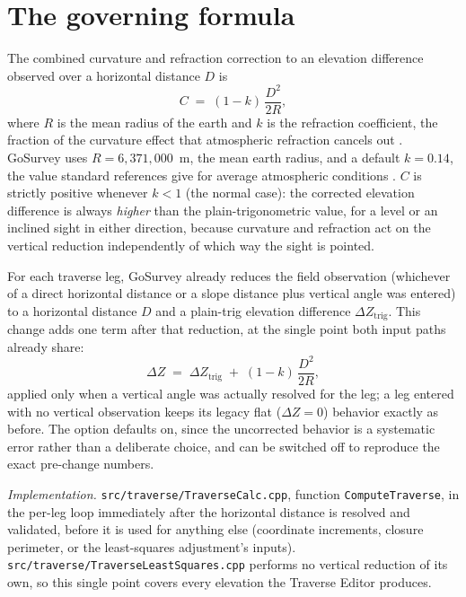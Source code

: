\documentclass[11pt]{article}
\begin{document}
\section{The governing formula}

The combined curvature and refraction correction to an elevation difference
observed over a horizontal distance $D$ is
\begin{equation}
C \;=\; (1-k)\,\frac{D^{2}}{2R},
\label{eq:cr}
\end{equation}
where $R$ is the mean radius of the earth and $k$ is the refraction
coefficient, the fraction of the curvature effect that atmospheric
refraction cancels out \citep{ghilaniwolf2015,bannister1998}. GoSurvey uses
$R = 6{,}371{,}000$~m, the mean earth radius, and a default
$k = 0.14$, the value standard references give for average atmospheric
conditions \citep{ghilaniwolf2015}. $C$ is strictly positive whenever
$k < 1$ (the normal case): the corrected elevation difference is always
\emph{higher} than the plain-trigonometric value, for a level or an
inclined sight in either direction, because curvature and refraction act on
the vertical reduction independently of which way the sight is pointed.

For each traverse leg, GoSurvey already reduces the field observation
(whichever of a direct horizontal distance or a slope distance plus
vertical angle was entered) to a horizontal distance $D$ and a plain-trig
elevation difference $\Delta Z_{\mathrm{trig}}$. This change adds one term
after that reduction, at the single point both input paths already share:
\begin{equation}
\Delta Z \;=\; \Delta Z_{\mathrm{trig}} \;+\; (1-k)\,\frac{D^{2}}{2R},
\label{eq:dz}
\end{equation}
applied only when a vertical angle was actually resolved for the leg; a leg
entered with no vertical observation keeps its legacy flat ($\Delta Z = 0$)
behavior exactly as before. The option defaults on, since the uncorrected
behavior is a systematic error rather than a deliberate choice, and can be
switched off to reproduce the exact pre-change numbers.

\emph{Implementation.} \texttt{src/traverse/TraverseCalc.cpp}, function
\texttt{ComputeTraverse}, in the per-leg loop immediately after the
horizontal distance is resolved and validated, before it is used for
anything else (coordinate increments, closure perimeter, or the
least-squares adjustment's inputs). \texttt{src/traverse/TraverseLeastSquares.cpp}
performs no vertical reduction of its own, so this single point covers
every elevation the Traverse Editor produces.
\end{document}
